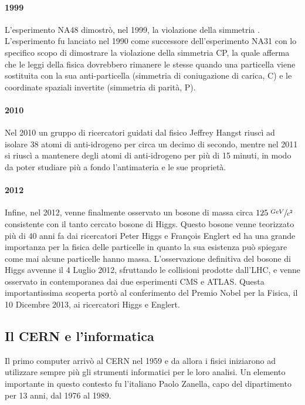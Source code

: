 			\paragraph{1999}L'esperimento NA48 dimostrò, nel 1999, la violazione della simmetria . L'esperimento fu lanciato nel 1990 come successore dell'esperimento NA31 con lo specifico scopo di dimostrare la violazione della simmetria \ac{CP}, la quale afferma che le leggi della fisica dovrebbero rimanere le stesse quando una particella viene sostituita con la sua anti-particella (simmetria di coniugazione di carica, C) e le coordinate spaziali invertite (simmetria di parità, P).
			
			\paragraph{2010}Nel 2010 un gruppo di ricercatori guidati dal fisico Jeffrey Hangst riuscì ad isolare 38 atomi di anti-idrogeno per circa un decimo di secondo, mentre nel 2011 si riuscì a mantenere degli atomi di anti-idrogeno per più di 15 minuti, in modo da poter studiare più a fondo l'antimateria e le sue proprietà.
			
			\paragraph{2012}Infine, nel 2012, venne finalmente osservato un bosone di massa circa $125 \; \sfrac{GeV}{c^2}$ consistente con il tanto cercato bosone di Higgs. Questo bosone venne teorizzato più di 40 anni fa dai ricercatori Peter Higgs e François Englert ed ha una grande importanza per la fisica delle particelle in quanto la sua esistenza può spiegare come mai alcune particelle hanno massa. L'osservazione definitiva del bosone di Higgs avvenne il 4 Luglio 2012, sfruttando le collisioni prodotte dall'\ac{LHC}, e venne osservato in contemporanea dai due esperimenti \ac{CMS} e \ac{ATLAS}. Questa importantissima scoperta portò al conferimento del Premio Nobel per la Fisica, il 10 Dicembre 2013, ai ricercatori Higgs e Englert.
			
		\subsection{Il CERN e l'informatica} \label{subsec:C;s;informatica}
		
			Il primo computer arrivò al \ac{CERN} nel 1959 e da allora i fisici iniziarono ad utilizzare sempre più gli strumenti informatici per le loro analisi. Un elemento importante in questo contesto fu l'italiano Paolo Zanella, capo del dipartimento  per 13 anni, dal 1976 al 1989.
			
